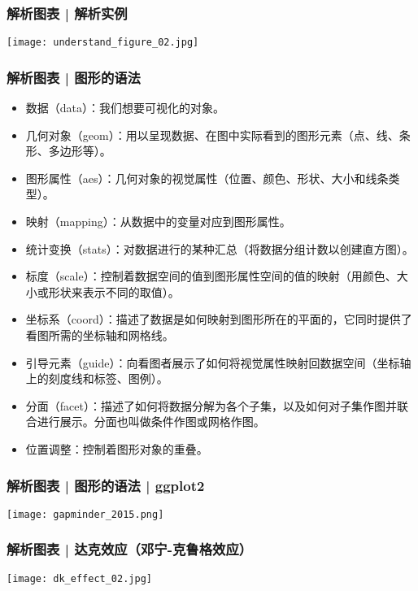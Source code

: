 \begin{frame}
  \frametitle{解析图表 | 解析实例}
  \begin{center}
    \texttt{[image: understand\_figure\_02.jpg]}
  \end{center}
\end{frame}

\begin{frame}
  \frametitle{解析图表 | 图形的语法}
\begin{itemize}
  \item 数据（data）：我们想要可视化的对象。
  \item 几何对象（geom）：用以呈现数据、在图中实际看到的图形元素（点、线、条形、多边形等）。
  \item 图形属性（aes）：几何对象的视觉属性（位置、颜色、形状、大小和线条类型）。
  \item 映射（mapping）：从数据中的变量对应到图形属性。
  \item 统计变换（stats）：对数据进行的某种汇总（将数据分组计数以创建直方图）。
  \item 标度（scale）：控制着数据空间的值到图形属性空间的值的映射（用颜色、大小或形状来表示不同的取值）。
  \item 坐标系（coord）：描述了数据是如何映射到图形所在的平面的，它同时提供了看图所需的坐标轴和网格线。
  \item 引导元素（guide）：向看图者展示了如何将视觉属性映射回数据空间（坐标轴上的刻度线和标签、图例）。
  \item 分面（facet）：描述了如何将数据分解为各个子集，以及如何对子集作图并联合进行展示。分面也叫做条件作图或网格作图。
  \item 位置调整：控制着图形对象的重叠。
\end{itemize}
\end{frame}

\begin{frame}
  \frametitle{解析图表 | 图形的语法 | ggplot2}
  \begin{center}
    \texttt{[image: gapminder\_2015.png]}
  \end{center}
\end{frame}

\begin{frame}
  \frametitle{解析图表 | 达克效应（邓宁-克鲁格效应）}
  \begin{center}
    \texttt{[image: dk\_effect\_02.jpg]}
  \end{center}
\end{frame}

